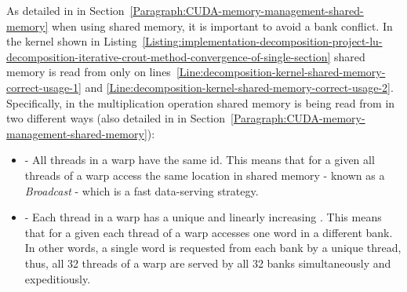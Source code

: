 As detailed in \textit{} in Section~\ref{Paragraph:CUDA-memory-management-shared-memory} when using shared memory, it is important to avoid a bank conflict. In the kernel shown in Listing~\ref{Listing:implementation-decomposition-project-lu-decomposition-iterative-crout-method-convergence-of-single-section} shared memory is read from only on lines~\ref{Line:decomposition-kernel-shared-memory-correct-usage-1} and \ref{Line:decomposition-kernel-shared-memory-correct-usage-2}. Specifically, in the multiplication operation  shared memory is being read from in two different ways (also detailed in \textit{} in Section~\ref{Paragraph:CUDA-memory-management-shared-memory}):

\begin{itemize}
	\item {} - All threads in a warp have the same  id. This means that for a given  all threads of a warp access the same location in shared memory - known as a \textit{Broadcast} - which is a fast data-serving strategy.
	\item {} - Each thread in a warp has a unique and linearly increasing . This means that for a given  each thread of a warp accesses one word in a different bank. In other words, a single word is requested from each bank by a unique thread, thus, all 32 threads of a warp are served by all 32 banks simultaneously and expeditiously.
\end{itemize}

